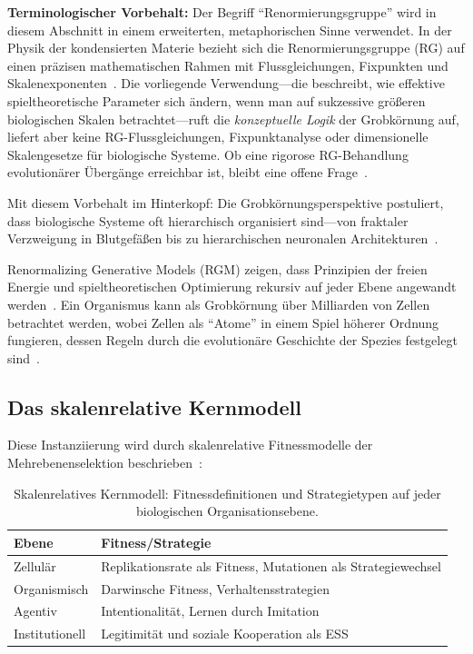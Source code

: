 \documentclass[12pt,a4paper]{article}
\theoremstyle{remark}
\begin{document}
\textbf{Terminologischer Vorbehalt:} Der Begriff ``Renormierungsgruppe'' wird in diesem Abschnitt in einem erweiterten, metaphorischen Sinne verwendet. In der Physik der kondensierten Materie bezieht sich die Renormierungsgruppe (RG) auf einen präzisen mathematischen Rahmen mit Flussgleichungen, Fixpunkten und Skalenexponenten~\citep{ScaleRGResearch}. Die vorliegende Verwendung---die beschreibt, wie effektive spieltheoretische Parameter sich ändern, wenn man auf sukzessive größeren biologischen Skalen betrachtet---ruft die \emph{konzeptuelle Logik} der Grobkörnung auf, liefert aber keine RG-Flussgleichungen, Fixpunktanalyse oder dimensionelle Skalengesetze für biologische Systeme. Ob eine rigorose RG-Behandlung evolutionärer Übergänge erreichbar ist, bleibt eine offene Frage~\citep{ScaleRGFrontiers}.

Mit diesem Vorbehalt im Hinterkopf: Die Grobkörnungsperspektive postuliert, dass biologische Systeme oft hierarchisch organisiert sind---von fraktaler Verzweigung in Blutgefäßen bis zu hierarchischen neuronalen Architekturen~\citep{SelfSimilarNetworks}.

Renormalizing Generative Models (RGM) zeigen, dass Prinzipien der freien Energie und spieltheoretischen Optimierung rekursiv auf jeder Ebene angewandt werden~\citep{ScaleRGFrontiers}. Ein Organismus kann als Grobkörnung über Milliarden von Zellen betrachtet werden, wobei Zellen als ``Atome'' in einem Spiel höherer Ordnung fungieren, dessen Regeln durch die evolutionäre Geschichte der Spezies festgelegt sind~\citep{ReplicatorOptimization}.

\subsection{Das skalenrelative Kernmodell}

Diese Instanziierung wird durch skalenrelative Fitnessmodelle der Mehrebenenselektion beschrieben~\citep{Okasha2006,Michod1999,ReplicatorOptimization}:

\begin{table}[htbp]
\centering
\caption{Skalenrelatives Kernmodell: Fitnessdefinitionen und Strategietypen auf jeder biologischen Organisationsebene.}
\label{tab:scale-kernel}
\begin{tabular}{ll}
\toprule
\textbf{Ebene} & \textbf{Fitness/Strategie} \\
\midrule
Zellulär & Replikationsrate als Fitness, Mutationen als Strategiewechsel \\
Organismisch & Darwinsche Fitness, Verhaltensstrategien \\
Agentiv & Intentionalität, Lernen durch Imitation \\
Institutionell & Legitimität und soziale Kooperation als ESS \\
\bottomrule
\end{tabular}
\end{table}
\end{document}
